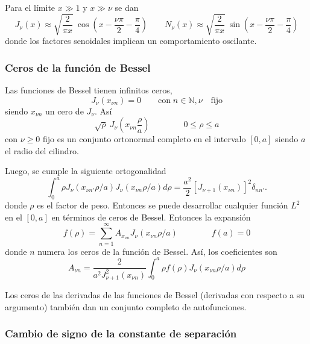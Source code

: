 \documentclass[10pt,oneside]{CBFT_book}
\begin{document}
Para el límite $ x \gg 1 $ y $ x \gg \nu$ se dan
\[
	J_\nu(x) \approx \sqrt{ \frac{2}{\pi x} } \: \cos\left( x - \frac{\nu \pi}{2} - \frac{\pi}{4} \right) \qquad 
	N_\nu(x) \approx \sqrt{ \frac{2}{\pi x} } \: \sin\left( x - \frac{\nu \pi}{2} - \frac{\pi}{4} \right)
\]
donde los factores senoidales implican un comportamiento oscilante.

\subsubsection{Ceros de la función de Bessel}

Las funciones de Bessel tienen infinitos ceros,
\[
	J_\nu(x_{\nu n}) = 0 \qquad \mathrm{con} \; n\in\mathbb{N}, \nu \quad \mathrm{fijo} 
\]
siendo $x_{\nu n}$ un cero de $J_\nu$. Así
\[
	\sqrt{\rho} \: J_\nu\left( x_{\nu n} \frac \rho a \right) \qquad\qquad 0 \leq \rho \leq a
\]
con $\nu \geq 0$ fijo es un conjunto ortonormal completo en el intervalo $[0,a]$ siendo $a$ 
el radio del cilindro.

Luego, se cumple la siguiente ortogonalidad
\[
	\int_0^a \rho  J_\nu (x_{\nu n'} \rho/a)  J_\nu (x_{\nu n} \rho/a)  d\rho = 
	\frac{a^2}{2}[J_{\nu+1}(x_{\nu n})]^2 \delta_{nn'}.
\]
donde $\rho$ es el factor de peso. Entonces se puede desarrollar cualquier función $L^2$ en el $[0,a]$
en términos de ceros de Bessel.
Entonces la expansión
\[
	f(\rho) = \sum_{n=1}^{\infty}  A_{x_{\nu n}} J_{\nu}( x_{\nu n} \rho/a ) \qquad \qquad 
	f(a) = 0
\]
donde $n$ numera los ceros de la función de Bessel.
Así, los coeficientes son
\[
	A_{\nu n} = \frac{2}{a^2 J_{\nu +1}^2 (x_{\nu n})} 
	\int_0^a \rho f(\rho) J_\nu (x_{\nu n} \rho/a) 	d\rho
\]

Los ceros de las derivadas de las funciones de Bessel (derivadas con respecto a su argumento) 
también dan un conjunto completo de autofunciones.

\subsubsection{Cambio de signo de la constante de separación}
\end{document}
